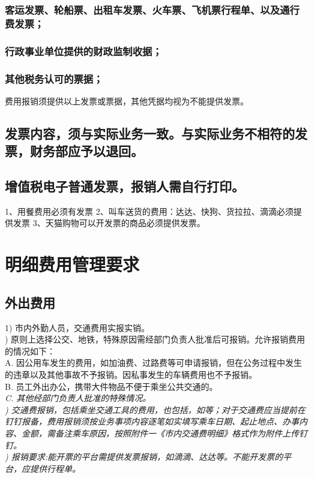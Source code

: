 \documentclass[scheme=plain,UTF8]{ctexart}
\begin{document}
\subsubsection{客运发票、轮船票、出租车发票、火车票、飞机票行程单、以及通行费发票；}
\subsubsection{行政事业单位提供的财政监制收据；}
\subsubsection{其他税务认可的票据；}
费用报销须提供以上发票或票据，其他凭据均视为不能提供发票。
\subsection{发票内容，须与实际业务一致。与实际业务不相符的发票，财务部应予以退回。}
\subsection{增值税电子普通发票，报销人需自行打印。}
1、用餐费用必须有发票
2、叫车送货的费用：达达、快狗、货拉拉、滴滴必须提供发票
3、天猫购物可以开发票的商品必须提供发票。

\section{明细费用管理要求}
\subsection{外出费用}
1)	市内外勤人员，交通费用实报实销。\\)	原则上选择公交、地铁，特殊原因需经部门负责人批准后可报销。允许报销费用的情况如下：\\\indent
A.	因公用车发生的费用，如加油费、过路费等可申请报销，但在公务过程中发生的违章以及其他事故不予报销。因私事发生的车辆费用也不予报销。\\\indent
B.	员工外出办公，携带大件物品不便于乘坐公共交通的。\\\indent\em
C.	其他经部门负责人批准的特殊情况。\\)	交通费报销，包括乘坐交通工具的费用，也包括，如等；对于交通费应当提前在钉钉报备，费用报销须按业务事项内容逐笔如实填写乘车日期、起止地点、办事内容、金额，需备注乘车原因，按照附件一《市内交通费明细》格式作为附件上传钉钉。\\)  报销要求:能开票的平台需提供发票报销，如滴滴、达达等。不能开发票的平台，应提供行程单。
\end{document}
